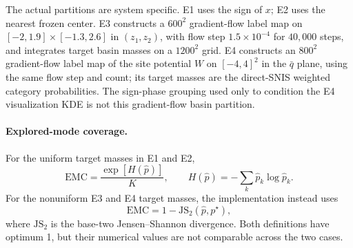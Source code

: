 \documentclass[11pt]{article}
\begin{document}
The actual partitions are system specific.  E1 uses the sign of $x$; E2 uses
the nearest frozen center.  E3 constructs a $600^2$ gradient-flow label map on
$[-2,1.9]\times[-1.3,2.6]$ in $(z_1,z_2)$, with flow step
$1.5\times10^{-4}$ for $40{,}000$ steps, and integrates target basin masses on
a $1200^2$ grid.  E4 constructs an $800^2$ gradient-flow label map of the site
potential $W$ on $[-4,4]^2$ in the $\bar q$ plane, using the same flow step
and count; its target masses are the direct-SNIS weighted category
probabilities.  The sign-phase grouping used only to condition the E4
visualization KDE is not this gradient-flow basin partition.

\paragraph{Explored-mode coverage.}
For the uniform target masses in E1 and E2,
\begin{equation}
 \mathrm{EMC}=\frac{\exp[H(\widehat p)]}{K},\qquad
 H(\widehat p)=-\sum_k\widehat p_k\log\widehat p_k .
\end{equation}
For the nonuniform E3 and E4 target masses, the implementation instead uses
\begin{equation}
 \mathrm{EMC}=1-\mathrm{JS}_2(\widehat p,p^\star),
\end{equation}
where $\mathrm{JS}_2$ is the base-two Jensen--Shannon divergence.  Both
definitions have optimum 1, but their numerical values are not comparable
across the two cases.
\end{document}
